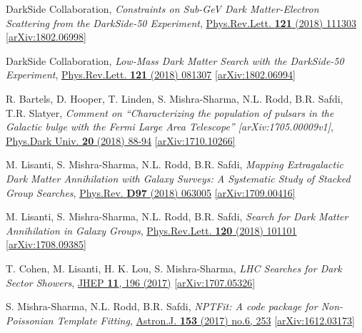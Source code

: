 \documentclass[11pt]{article}
\newenvironment{packed_enumerate}{
\begin{etaremune}
  \setlength{\itemsep}{3pt}
  \setlength{\parskip}{0pt}
  \setlength{\parsep}{0pt}}{\end{etaremune}
}
\begin{document}
\begin{packed_enumerate}
\item DarkSide Collaboration, \emph{Constraints on Sub-GeV Dark Matter-Electron Scattering from the DarkSide-50 Experiment}, \href{https://journals.aps.org/prl/abstract/10.1103/PhysRevLett.121.111303}{Phys.Rev.Lett. \textbf{121} (2018) 111303} \href{https://arxiv.org/abs/1802.06998}{[arXiv:1802.06998]}

\item DarkSide Collaboration, \emph{Low-Mass Dark Matter Search with the DarkSide-50 Experiment}, \href{https://journals.aps.org/prl/abstract/10.1103/PhysRevLett.121.081307}{Phys.Rev.Lett. \textbf{121} (2018) 081307}  \href{https://arxiv.org/abs/1802.06994}{[arXiv:1802.06994]}

\item R. Bartels, D. Hooper, T. Linden, S. Mishra-Sharma, N.L. Rodd, B.R. Safdi, T.R. Slatyer, \emph{Comment on ``Characterizing the population of pulsars in the Galactic bulge with the
  {\it Fermi} Large Area Telescope'' [arXiv:1705.00009\MakeLowercase{v}1]}, \href{https://www.sciencedirect.com/science/article/pii/S2212686418300268}{Phys.Dark Univ. \textbf{20} (2018) 88-94} \href{https://arxiv.org/abs/1710.10266}{[arXiv:1710.10266]}

\item M. Lisanti, S. Mishra-Sharma, N.L. Rodd, B.R. Safdi, \emph{Mapping Extragalactic Dark Matter Annihilation with Galaxy Surveys: A Systematic Study of Stacked Group Searches},  \href{https://journals.aps.org/prd/abstract/10.1103/PhysRevD.97.063005}{Phys.Rev. \textbf{D97} (2018) 063005} \href{https://arxiv.org/abs/1709.00416}{[arXiv:1709.00416]}

\item M. Lisanti, S. Mishra-Sharma, N.L. Rodd, B.R. Safdi, \emph{Search for Dark Matter Annihilation in Galaxy Groups},  \href{https://journals.aps.org/prl/abstract/10.1103/PhysRevLett.120.101101}{Phys.Rev.Lett. \textbf{120} (2018) 101101} \href{https://arxiv.org/abs/1708.09385}{[arXiv:1708.09385]}

\item T. Cohen, M. Lisanti, H. K. Lou, S. Mishra-Sharma, \emph{LHC Searches for Dark Sector Showers},  \href{https://link.springer.com/article/10.1007/JHEP11(2017)196}{JHEP \textbf{11}, 196 (2017)}  \href{https://arxiv.org/abs/1707.05326}{ [arXiv:1707.05326]}

\item S. Mishra-Sharma, N.L. Rodd, B.R. Safdi, \emph{NPTFit: A code package for Non-Poissonian Template Fitting},  \href{http://iopscience.iop.org/article/10.3847/1538-3881/aa6d5f/meta}{Astron.J. \textbf{153} (2017) no.6, 253}  \href{https://arxiv.org/abs/1612.03173}{ [arXiv:1612.03173]}


\end{packed_enumerate}
\end{document}
